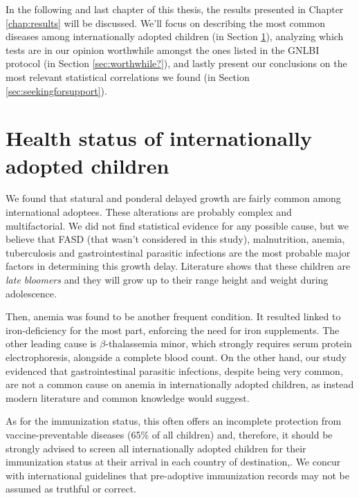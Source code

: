 

\label{chap:discussion}
In the following and last chapter of this thesis, the results presented in Chapter \ref{chap:results} will be discussed. We'll focus on describing the most common diseases among internationally adopted children (in Section \ref{sec:healthstatusofIAC}), analyzing which tests are in our opinion worthwhile amongst the ones listed in the GNLBI protocol (in Section \ref{sec:worthwhile?}), and lastly present our conclusions on the most relevant statistical correlations we found (in Section \ref{sec:seekingforsupport}). 

\section{Health status of internationally adopted children}\label{sec:healthstatusofIAC}
We found that statural and ponderal delayed growth are fairly common among international adoptees. These alterations are probably complex and multifactorial. We did not find statistical evidence for any possible cause, but we believe that FASD (that wasn't considered in this study), malnutrition, anemia, tuberculosis and gastrointestinal parasitic infections are the most probable major factors in determining this growth delay. Literature shows that these children are \textit{late bloomers} and they will grow up to their range height and weight during adolescence.

Then, anemia was found to be another frequent condition. It resulted linked to iron-deficiency for the most part, enforcing the need for iron supplements. The other leading cause is $\beta$-thalassemia minor, which strongly requires serum protein electrophoresis, alongside a complete blood count. On the other hand, our study evidenced that gastrointestinal parasitic infections, despite being very common, are not a common cause on anemia in internationally adopted children, as instead modern literature and common knowledge would suggest.

As for the immunization status, this often offers an incomplete protection from vaccine-preventable diseases (65\% of all children) and, therefore, it should be strongly advised to screen all internationally adopted children for their immunization status at their arrival in each country of destination,. We concur with international guidelines that pre-adoptive immunization records may not be assumed as truthful or correct.

